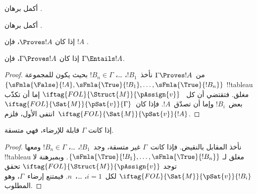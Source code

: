 \documentclass[../../../include/open-logic-section]{subfiles}
\begin{document}
\begin{prob}
أكمل برهان .
\end{prob}
\tagendprob

\begin{prob}
أكمل برهان .
\end{prob}
\tagendprob

\begin{cor}
إذا كان $\Proves !A$، فإن $!A$ .
\end{cor}

\begin{cor}
إذا كان $\Gamma \Proves !A$، فإن $\Gamma \Entails !A$.
\end{cor}

\begin{proof}
  من~$\Gamma \Proves !A$ نأخذ~$!B_1$، \dots، $!B_n \in
  \Gamma$ بحيث يكون للمجموعة~$\{\sFmla{\False}{!A}, \sFmla{\True}{!B_1}, \dots,
  \sFmla{\True}{!B_n}\}$ !!{tableau} مغلق. فتقتضي
   أن كل
  ~$\iftag{FOL}{\Struct{M}}{\pAssign{v}}$
  إما أن تكذّب بعض~$!B_i$ وإما أن تصدّق~$!A$.
  فإذا كان~$\iftag{FOL}{\Sat{M}}{\pSat{v}}{\Gamma}$ انتفى الأول،
  فلزم~$\iftag{FOL}{\Sat{M}}{\pSat{v}}{!A}$.
\end{proof}

\begin{cor}
إذا كانت $\Gamma$ قابلة للإرضاء، فهي متسقة.
\end{cor}

\begin{proof}
نأخذ المقابل بالنقيض. فإذا كانت~$\Gamma$ غير متسقة، وجد~$!B_1$،
\dots، $!B_n \in \Gamma$ ومعها !!{tableau} مغلق لـ
$\{\sFmla{\True}{!B_1}, \dots, \sFmla{\True}{!B_n}\}$.
وبمبرهنة  لا توجد
$\iftag{FOL}{\Struct{M}}{\pAssign{v}}$ تحقق
$\iftag{FOL}{\Sat{M}}{\pSat{v}}{!B_i}$ لكل~$i=1$، \dots،~$n$.
فيمتنع إرضاء~$\Gamma$، وهو المطلوب.
\end{proof}
\end{document}

